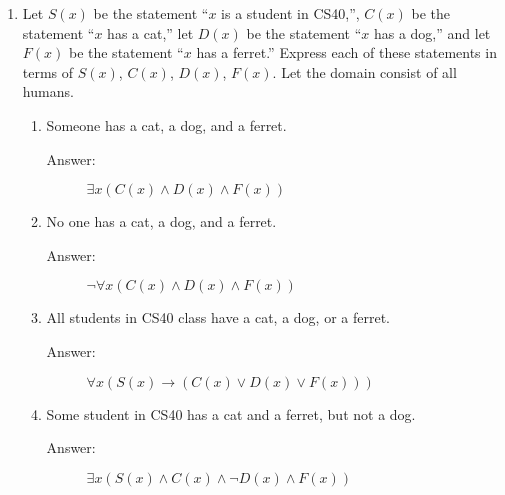 \documentclass[12pt, oneside]{article}
\begin{document}
\begin{enumerate}
\item Let  $S(x)$ be the statement ``$x$ is a student in CS40,'',  $C(x)$ be the statement ``$x$ has a cat,'' let $D(x)$ be the statement ``$x$ has a dog,'' and let $F(x)$ be the statement ``$x$ has a ferret.'' Express each of these statements in terms of $S(x)$, $C(x)$, $D(x)$, $F(x)$. Let the domain consist of all humans.
\begin{enumerate}
    \item Someone has a cat, a dog, and a ferret.
    \begin{description}
        \item[Answer:] $\exists x(C(x) \land D(x) \land F(x))$ 
    \end{description}
    \item No one has a cat, a dog, and a ferret.
    \begin{description}
        \item[Answer:] $\lnot \forall x(C(x) \land D(x) \land F(x))$ 
    \end{description}
    \item All students in CS40 class have a cat, a dog, or a ferret.
    \begin{description}
        \item[Answer:] $\forall x (S(x) \rightarrow (C(x) \lor D(x) \lor F(x)))$ 
    \end{description}
    \item Some student in CS40  has a cat and a ferret, but not a dog.
    \begin{description}
        \item[Answer:] $\exists x(S(x) \land C(x) \land \lnot D(x) \land F(x))$
    \end{description}
\end{enumerate}
 




\end{enumerate}
\end{document}
